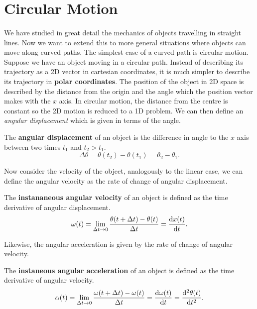 \documentclass[../newtonian_mechanics.tex]{subfiles}
\begin{document}
    \section{Circular Motion}
        \paragraph{}
        We have studied in great detail the mechanics of objects travelling in straight lines.
        Now we want to extend this to more general situations where objects can move along curved paths.
        The simplest case of a curved path is circular motion.
        Suppose we have an object moving in a circular path.
        Instead of describing its trajectory as a 2D vector in cartesian coordinates, it is much simpler to describe its trajectory in \textbf{polar coordinates}.
        The position of the object in 2D space is described by the distance from the origin and the angle which the position vector makes with the $x$ axis.
        In circular motion, the distance from the centre is constant so the 2D motion is reduced to a 1D problem.
        We can then define an \textit{angular displacement} which is given in terms of the angle.
        \begin{definition}
            The \textbf{angular displacement} of an object is the difference in angle to the $x$ axis between two times $t_1$ and $t_2>t_1$.
            \begin{equation}
                \Delta\theta=\theta(t_2)-\theta(t_1)=\theta_2-\theta_1.
            \end{equation}
        \end{definition}
        Now consider the velocity of the object, analogously to the linear case, we can define the angular velocity as the rate of change of angular displacement.
        \begin{definition}
            The \textbf{instananeous angular velocity} of an object is defined as the time derivative of angular displacement.
            \begin{equation}
                \omega(t)=\lim_{\Delta t\to0}\frac{\theta(t+\Delta t)-\theta(t)}{\Delta t}=\dv{x(t)}{t}.
            \end{equation}
        \end{definition}
        Likewise, the angular acceleration is given by the rate of change of angular velocity.
        \begin{definition}
            The \textbf{instaneous angular acceleration} of an object is defined as the time derivative of angular velocity.
            \begin{equation}
                \alpha(t)=\lim_{\Delta t\to0}\frac{\omega(t+\Delta t)-\omega(t)}{\Delta t}=\dv{\omega(t)}{t}=\dv[2]{\theta(t)}{t}.
            \end{equation}
        \end{definition}
\end{document}
